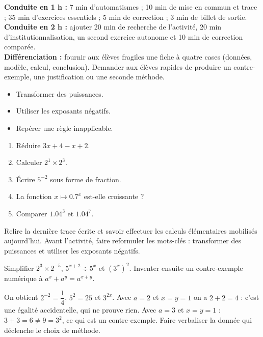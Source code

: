 \ifmxteacher
\begin{method}
\textbf{Conduite en 1 h :} 7 min d'automatismes ; 10 min de mise en commun et trace ; 35 min d'exercices essentiels ; 5 min de correction ; 3 min de billet de sortie.\\
\textbf{Conduite en 2 h :} ajouter 20 min de recherche de l'activité, 20 min d'institutionnalisation, un second exercice autonome et 10 min de correction comparée.\\
\textbf{Différenciation :} fournir aux élèves fragiles une fiche à quatre cases (données, modèle, calcul, conclusion). Demander aux élèves rapides de produire un contre-exemple, une justification ou une seconde méthode.
\end{method}
\fi
{}
\begin{objectives}\begin{itemize}\item Transformer des puissances.\item Utiliser les exposants négatifs.\item Repérer une règle inapplicable.\end{itemize}\end{objectives}
\begin{fluency}\begin{enumerate}\item Réduire $3x+4-x+2$. \item Calculer $2^1\times2^3$. \item Écrire $5^{-2}$ sous forme de fraction. \item La fonction $x\mapsto\num{0,7}^x$ est-elle croissante ? \item Comparer $\num{1,04}^3$ et $\num{1,04}^7$. \end{enumerate}\end{fluency}
\begin{prerequisites}Relire la dernière trace écrite et savoir effectuer les calculs élémentaires mobilisés aujourd'hui. Avant l'activité, faire reformuler les mots-clés : transformer des puissances et utiliser les exposants négatifs.\end{prerequisites}

\begin{activity}
Simplifier $2^3\times2^{-5}$, $5^{x+2}\div5^x$ et $(3^x)^2$. Inventer ensuite un contre-exemple numérique à $a^x+a^y=a^{x+y}$.

\end{activity}
\begin{solution}On obtient $2^{-2}=\dfrac14$, $5^2=25$ et $3^{2x}$. Avec $a=2$ et $x=y=1$ on a $2+2=4$ : c'est une égalité accidentelle, qui ne prouve rien. Avec $a=3$ et $x=y=1$ : $3+3=6\neq9=3^{2}$, ce qui est un contre-exemple. Faire verbaliser la donnée qui déclenche le choix de méthode.\end{solution}

